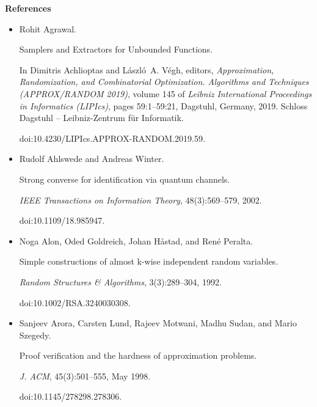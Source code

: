 \documentclass[10pt,a4paper]{article}
\begin{document}
\par\medskip\noindent\textbf{References}\par



\begin{itemize}


\item[] 
[1]

Rohit Agrawal.


Samplers and Extractors for Unbounded Functions.


In Dimitris Achlioptas and László A. Végh, editors, \emph{Approximation, Randomization, and Combinatorial Optimization. Algorithms and
Techniques (APPROX/RANDOM 2019)}, volume 145 of \emph{Leibniz International
Proceedings in Informatics (LIPIcs)}, pages 59:1–59:21, Dagstuhl, Germany,
2019. Schloss Dagstuhl – Leibniz-Zentrum für Informatik.


doi:10.4230/LIPIcs.APPROX-RANDOM.2019.59.





\item[] 
[2]

Rudolf Ahlswede and Andreas Winter.


Strong converse for identification via quantum channels.


\emph{IEEE Transactions on Information Theory}, 48(3):569–579, 2002.


doi:10.1109/18.985947.





\item[] 
[3]

Noga Alon, Oded Goldreich, Johan Håstad, and René Peralta.


Simple constructions of almost k-wise independent random variables.


\emph{Random Structures \& Algorithms}, 3(3):289–304, 1992.


doi:10.1002/RSA.3240030308.





\item[] 
[4]

Sanjeev Arora, Carsten Lund, Rajeev Motwani, Madhu Sudan, and Mario Szegedy.


Proof verification and the hardness of approximation problems.


\emph{J. ACM}, 45(3):501–555, May 1998.


doi:10.1145/278298.278306.






\end{itemize}
\end{document}
